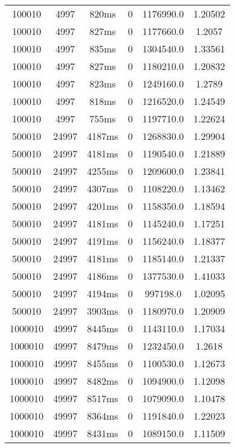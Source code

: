 \documentclass[./main.tex]{subfiles}
\begin{document}
\begin{table}
\begin{tabular}{ c | c | c | c | c | c }
        100010 & 4997 & 820ms & 0 & 1176990.0 & 1.20502 \\
        100010 & 4997 & 827ms & 0 & 1177660.0 & 1.2057 \\
        100010 & 4997 & 835ms & 0 & 1304540.0 & 1.33561 \\
        100010 & 4997 & 827ms & 0 & 1180210.0 & 1.20832 \\
        100010 & 4997 & 823ms & 0 & 1249160.0 & 1.2789 \\
        \rowcolor{lightgray} 100010 & 4997 & 818ms & 0 & 1216520.0 & 1.24549 \\
        100010 & 4997 & 755ms & 0 & 1197710.0 & 1.22624 \\
        \hline
        500010 & 24997 & 4187ms & 0 & 1268830.0 & 1.29904 \\
        500010 & 24997 & 4181ms & 0 & 1190540.0 & 1.21889 \\
        500010 & 24997 & 4255ms & 0 & 1209600.0 & 1.23841 \\
        500010 & 24997 & 4307ms & 0 & 1108220.0 & 1.13462 \\
        500010 & 24997 & 4201ms & 0 & 1158350.0 & 1.18594 \\
        500010 & 24997 & 4181ms & 0 & 1145240.0 & 1.17251 \\
        500010 & 24997 & 4191ms & 0 & 1156240.0 & 1.18377 \\
        500010 & 24997 & 4181ms & 0 & 1185140.0 & 1.21337 \\
        500010 & 24997 & 4186ms & 0 & 1377530.0 & 1.41033 \\
        500010 & 24997 & 4194ms & 0 & 997198.0 & 1.02095 \\
        \rowcolor{lightgray} 500010 & 24997 & 3903ms & 0 & 1180970.0 & 1.20909 \\
        \hline
        \rowcolor{lightgray} 1000010 & 49997 & 8445ms & 0 & 1143110.0 & 1.17034 \\
        1000010 & 49997 & 8479ms & 0 & 1232450.0 & 1.2618 \\
        1000010 & 49997 & 8455ms & 0 & 1100530.0 & 1.12673 \\
        1000010 & 49997 & 8482ms & 0 & 1094900.0 & 1.12098 \\
        1000010 & 49997 & 8517ms & 0 & 1079090.0 & 1.10478 \\
        1000010 & 49997 & 8364ms & 0 & 1191840.0 & 1.22023 \\
        1000010 & 49997 & 8431ms & 0 & 1089150.0 & 1.11509 \\

\end{tabular}
\end{table}
\end{document}
